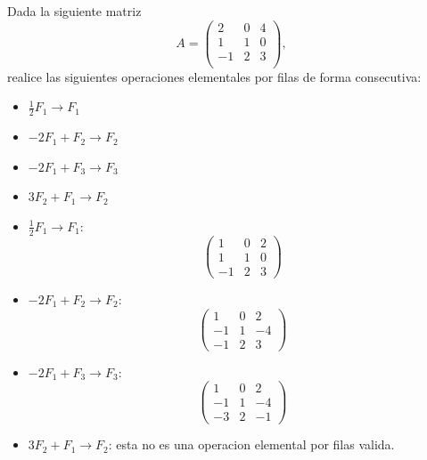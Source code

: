 \documentclass[11pt,respuestas,a4]{aleph-examen}
\begin{document}
\begin{preguntas}

\item
    Dada la siguiente matriz
    \[
        A=\begin{pmatrix}
                2 & 0 & 4 \\
                1 & 1 & 0 \\
                -1 & 2 & 3 \\
        \end{pmatrix},
    \]
    realice las siguientes operaciones elementales por filas de forma consecutiva:
    \begin{itemize}
        \item $\frac{1}{2}F_1\rightarrow F_1$ 
        \item $-2F_1+F_2\rightarrow F_2$ 
        \item $-2F_1+F_3\rightarrow F_3$ 
        \item $3F_2+F_1\rightarrow F_2$ 
    \end{itemize}

\begin{respuesta}
    \begin{itemize}
    \item
        $\frac{1}{2}F_1\rightarrow F_1$:
        \[
            \begin{pmatrix}
                1 & 0 & 2 \\
                1 & 1 & 0 \\
                -1 & 2 & 3
            \end{pmatrix}
        \]
    \item
        $-2F_1+F_2\rightarrow F_2$:
        \[
            \begin{pmatrix}
                1 & 0 & 2 \\
                -1 & 1 & -4 \\
                -1 & 2 & 3
            \end{pmatrix}
        \]
    \item
        $-2F_1+F_3\rightarrow F_3$:
        \[
            \begin{pmatrix}
                1 & 0 & 2 \\
                -1 & 1 & -4 \\
                -3 & 2 & -1
            \end{pmatrix}
        \]
    \item
        $3F_2+F_1\rightarrow F_2$: esta no es una operacion elemental por filas valida.\qedhere
    \end{itemize}
\end{respuesta}


\end{preguntas}
\end{document}

